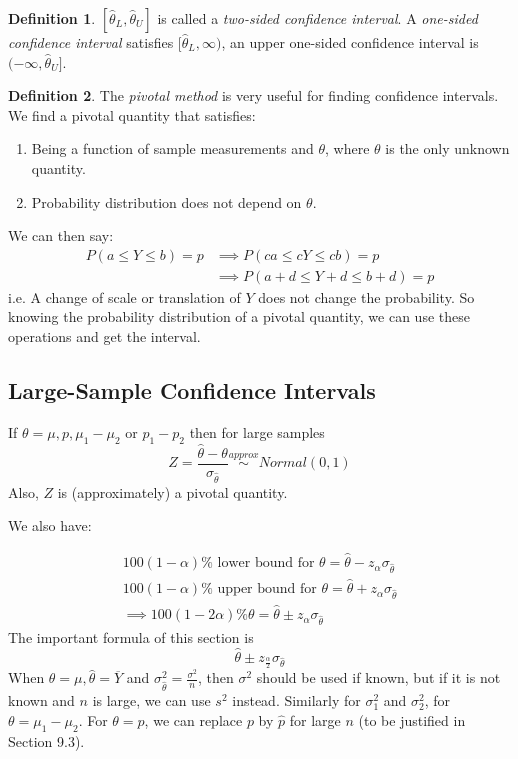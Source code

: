 \documentclass[12 pt]{article}
\theoremstyle{definition}
\newtheorem{defn}{Definition}
\begin{document}
    \begin{defn}
      $[\hat{\theta}_L, \hat{\theta}_U]$ is called a \textit{two-sided
      confidence interval}. A \textit{one-sided confidence interval}
    satisfies $[\hat{\theta}_L,\infty)$, an upper one-sided confidence
    interval is $(-\infty, \hat{\theta}_U]$.
  \end{defn}
  \begin{defn}
    The \textit{pivotal method} is very useful for finding confidence
    intervals. We find a pivotal quantity that satisfies:
    \begin{enumerate}
    \item Being a function of sample measurements and $\theta$, where
      $\theta$ is the only unknown quantity.
    \item Probability distribution does not depend on $\theta$.
    \end{enumerate}
    We can then say:
    \begin{align*}
      P(a \leq Y \leq b) = p &\implies P(ca \leq cY \leq cb) = p
      \\ & \implies P(a+d \leq Y+d \leq b+d) = p
    \end{align*}
    i.e. A change of scale or translation of $Y$ does not change the
    probability. So knowing the probability distribution of a pivotal
    quantity, we can use these operations and get the interval.
  \end{defn}
  \subsection{Large-Sample Confidence Intervals}
  If $\theta = \mu, p, \mu_1 - \mu_2$ or $p_1 - p_2$ then for large
  samples $$Z =
  \frac{\hat{\theta}-\theta}{\sigma_{\hat{\theta}}}\stackrel{approx}{\sim}Normal(0,1)$$
  Also, $Z$ is (approximately) a pivotal quantity.

  We also have:

  \begin{align*}
    100(1-\alpha)\% \text{ lower bound for }\theta = \hat{\theta}-z_{\alpha}\sigma_{\hat{\theta}}
    \\100(1-\alpha)\% \text{ upper bound for }\theta = \hat{\theta}+z_{\alpha}\sigma_{\hat{\theta}}
    \\ \implies 100(1-2\alpha)\%\theta = \hat{\theta}\pm z_{\alpha}\sigma_{\hat{\theta}}
  \end{align*}
  The important formula of this section is
  $$\hat{\theta} \pm z_{\frac{\alpha}{2}}\sigma_{\hat{\theta}}$$
  When $\theta = \mu, \hat{\theta} = \overline{Y}$ and
  $\sigma_{\hat{\theta}}^2 = \frac{\sigma^2}{n}$, then $\sigma^2$
  should be used if known, but if it is not known and $n$ is large, we
  can use $s^2$ instead. Similarly for $\sigma_1^2$ and
  $\sigma_2^2$, for $\theta = \mu_1 - \mu_2$. For $\theta = p$, we can
  replace $p$ by $\hat{p}$ for large $n$ (to be justified in Section 9.3).
\end{document}
